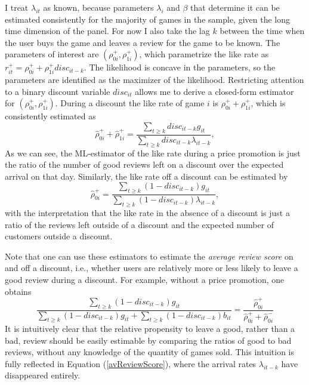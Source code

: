 \documentclass[12pt,pagebackref]{article}
\begin{document}
I treat \(\lambda_{it}\) as known, because parameters \(\lambda_{i}\)
and \(\beta\) that determine it can be estimated consistently for the
majority of games in the sample, given the long time dimension of the
panel. For now I also take the lag \(k\) between the time when the user
buys the game and leaves a review for the game to be known. The
parameters of interest are \((\rho_{0i}^+, \rho_{1i}^+)\), which
parametrize the like rate as
\(r_{it}^+ = \rho_{0i}^+ + \rho_{1i}^+ disc_{it-k}\). The likelihood is
concave in the parameters, so the parameters are identified as the
maximizer of the likelihood. Restricting attention to a binary discount
variable \(disc_{it}\) allows me to derive a closed-form estimator for
\((\rho_{0i}^+, \rho_{1i}^+)\). During a discount the like rate of game
\(i\) is \(\rho_{0i}^+ + \rho_{1i}^+\), which is consistently estimated
as \begin{equation}\label{rhohat1}
\hat \rho_{0i}^+ + \hat\rho_{1i}^+ = \frac{\sum_{t \ge k} disc_{it-k}g_{it}}{\sum_{t\ge k} disc_{it-k}\lambda_{it-k}},
\end{equation} As we can see, the ML-estimator of the like rate during a
price promotion is just the ratio of the number of good reviews left on
a discount over the expected arrival on that day. Similarly, the like
rate off a discount can be estimated by \begin{equation}\label{rhohat2}
\hat \rho_{0i}^+ = \frac{\sum_{t\ge k} (1-disc_{it-k})g_{it}}{\sum_{t\ge k} (1-disc_{it-k})\lambda_{it-k}},
\end{equation} with the interpretation that the like rate in the absence
of a discount is just a ratio of the reviews left outside of a discount
and the expected number of customers outside a discount.

Note that one can use these estimators to estimate the \emph{average
review score} on and off a discount, i.e., whether users are relatively
more or less likely to leave a good review during a discount. For
example, without a price promotion, one obtains
\begin{equation}\label{avReviewScore}
\frac{\sum_{t\ge k} (1-disc_{it-k})g_{it}}{\sum_{t\ge k} (1-disc_{it-k})g_{it} + \sum_{t\ge k} (1-disc_{it-k})b_{it}}
=
\frac{\hat \rho_{0i}^+}{\hat \rho_{0i}^+  + \hat \rho_{0i}^- }
\end{equation} It is intuitively clear that the relative propensity to
leave a good, rather than a bad, review should be easily estimable by
comparing the ratios of good to bad reviews, without any knowledge of
the quantity of games sold. This intuition is fully reflected in
Equation (\ref{avReviewScore}), where the arrival rates
\(\lambda_{it-k}\) have disappeared entirely.
\end{document}
